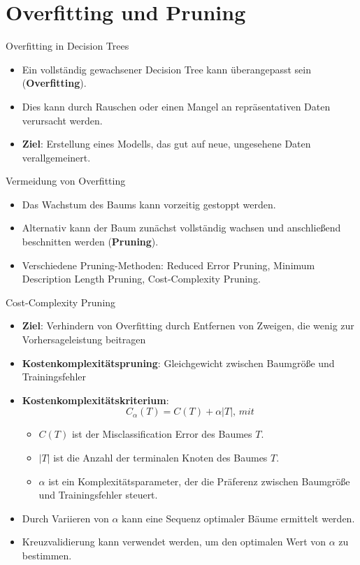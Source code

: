 \documentclass{beamer}
\begin{document}

\section{Overfitting und Pruning}

\begin{frame}{Overfitting in Decision Trees}
	\begin{itemize}
		\item {Ein vollständig gewachsener Decision Tree kann überangepasst sein (\textbf{Overfitting}).}
		\item {Dies kann durch Rauschen oder einen Mangel an repräsentativen Daten verursacht werden.}
		\item {\textbf{Ziel}: Erstellung eines Modells, das gut auf neue, ungesehene Daten verallgemeinert.}
	\end{itemize}
\end{frame}

\begin{frame}{Vermeidung von Overfitting}
	\begin{itemize}
		\item {Das Wachstum des Baums kann vorzeitig gestoppt werden.}
		\item {Alternativ kann der Baum zunächst vollständig wachsen und anschließend beschnitten werden (\textbf{Pruning}).}
		\item {Verschiedene Pruning-Methoden: Reduced Error Pruning, Minimum Description Length Pruning, Cost-Complexity Pruning.}
	\end{itemize}
\end{frame}

\begin{frame}{Cost-Complexity Pruning}
	\begin{itemize}
		\item {\textbf{Ziel}: Verhindern von Overfitting durch Entfernen von Zweigen, die wenig zur Vorhersageleistung beitragen}
		\item {\textbf{Kostenkomplexitätspruning}: Gleichgewicht zwischen Baumgröße und Trainingsfehler}
		\item \textbf{Kostenkomplexitätskriterium}: \[C_{\alpha}(T) = C(T) + \alpha|T|, \, mit\]
		\begin{itemize}
			\item $C(T)$ ist der Misclassification Error des Baumes $T$.
			\item $|T|$ ist die Anzahl der terminalen Knoten des Baumes $T$.
			\item $\alpha$ ist ein Komplexitätsparameter, der die Präferenz zwischen Baumgröße und Trainingsfehler steuert.
		\end{itemize}
		\item Durch Variieren von $\alpha$ kann eine Sequenz optimaler Bäume ermittelt werden.
		\item Kreuzvalidierung kann verwendet werden, um den optimalen Wert von $\alpha$ zu bestimmen.
	\end{itemize}
\end{frame}
\end{document}
